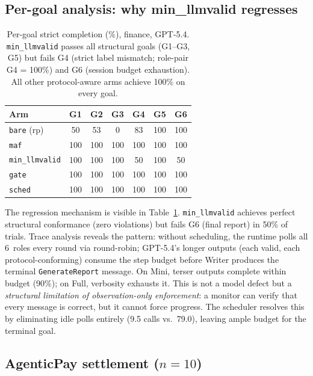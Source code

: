 \subsection{Per-goal analysis: why min\_llmvalid regresses}\label{sec:pergol}

\begin{table}[t]
\centering\small
\caption{Per-goal strict completion (\%), finance, GPT-5.4.
\texttt{min\_llmvalid} passes all structural goals (G1--G3, G5) but
fails G4 (strict label mismatch; role-pair G4 = 100\%) and G6
(session budget exhaustion).
All other protocol-aware arms achieve 100\% on every goal.}
\label{tab:pergol}
\begin{tabular}{@{}lcccccc@{}}
\toprule
\textbf{Arm} & \textbf{G1} & \textbf{G2} & \textbf{G3} & \textbf{G4} & \textbf{G5} & \textbf{G6} \\
\midrule
\texttt{bare} (rp) & 50 & 53 & 0 & 83 & 100 & 100 \\
\texttt{maf} & 100 & 100 & 100 & 100 & 100 & 100 \\
\texttt{min\_llmvalid} & 100 & 100 & 100 & 50 & 100 & 50 \\
\texttt{gate} & 100 & 100 & 100 & 100 & 100 & 100 \\
\texttt{sched} & 100 & 100 & 100 & 100 & 100 & 100 \\
\bottomrule
\end{tabular}
\end{table}

The regression mechanism is visible in Table~\ref{tab:pergol}.
\texttt{min\_llmvalid} achieves perfect structural conformance (zero
violations) but fails G6 (final report) in 50\% of trials.
Trace analysis reveals the pattern: without scheduling, the runtime
polls all 6~roles every round via round-robin; GPT-5.4's longer
outputs (each valid, each protocol-conforming) consume the step budget
before Writer produces the terminal \texttt{GenerateReport} message.
On Mini, terser outputs complete within budget (90\%); on Full,
verbosity exhausts it.
This is not a model defect but a \emph{structural limitation of
observation-only enforcement}: a monitor can verify that every message
is correct, but it cannot force progress.
The scheduler resolves this by eliminating idle polls entirely (9.5
calls vs.\ 79.0), leaving ample budget for the terminal goal.

\subsection{AgenticPay settlement ($n{=}10$)}\label{sec:agenticpay}


